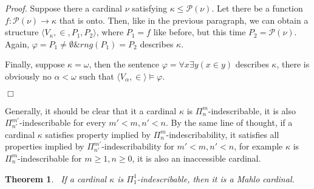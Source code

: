 \documentclass[12pt,a4paper]{article}
\newtheorem{theorem}{Theorem}[section]
\newenvironment{proof}
{\noindent \textit{Proof.}}
{\hspace*{\fill} $\Box$}
\newcommand{\power}[1]{\ensuremath{\mathscr{P}} (#1)}
\newcommand{\then}{\rightarrow}
\newcommand{\et}{\mathrel{\&}}
\begin{document}
\begin{proof}
Suppose there a cardinal $\nu$ satisfying $\kappa \leq \power{\nu}$. Let there be a function $f: \power{\nu} \then \kappa$ that is onto. Then, like in the previous paragraph, we can obtain a structure $\langle V_\kappa, \in, P_1, P_2 \rangle$, where $P_1 = f$ like before, but this time $P_2 = \power{\nu}$. Again, $\varphi = P_1 \neq \emptyset \et rng(P_1) = P_2$ describes $\kappa$.

Finally, suppose $\kappa = \omega$, then the sentence $\varphi = \forall x \exists y (x \in y)$ describes $\kappa$, there is obviously no $\alpha < \omega$ such that $\langle V_\alpha, \in \rangle \models \varphi$.

\end{proof}

Generally, it should be clear that it a cardinal $\kappa$ is $\Pi^m_n$-indescribable, it is also $\Pi^{m'}_{n'}$-indescribable for every $m'<m, n'<n$. By the same line of thought, if a cardinal $\kappa$ satisfies property implied by $\Pi^m_n$-indescribability, it satisfies all properties implied by $\Pi^{m'}_{n'}$-indescribability for $m'<m, n'<n$, for example $\kappa$ is $\Pi^m_n$-indescribable for $m \geq 1, n \geq 0$, it is also an inaccessible cardinal.


\begin{theorem}\
If a cardinal $\kappa$ is $\Pi^1_1$-indescribable, then it is a Mahlo cardinal.
\end{theorem}
\end{document}

